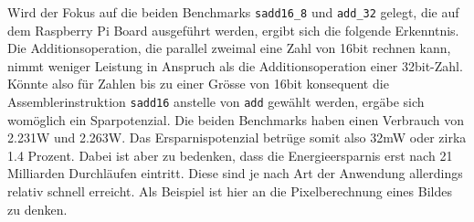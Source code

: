 Wird der Fokus auf die beiden Benchmarks \texttt{sadd16\_8} und \texttt{add\_32} gelegt, die auf dem Raspberry Pi Board ausgeführt werden, ergibt sich die folgende Erkenntnis. Die Additionsoperation, die parallel zweimal eine Zahl von 16bit rechnen kann, nimmt weniger Leistung in Anspruch als die Additionsoperation einer 32bit-Zahl. Könnte also für Zahlen bis zu einer Grösse von 16bit konsequent die Assemblerinstruktion \texttt{sadd16} anstelle von \texttt{add} gewählt werden, ergäbe sich womöglich ein Sparpotenzial. Die beiden Benchmarks haben einen Verbrauch von 2.231W und 2.263W. Das Ersparnispotenzial betrüge somit also 32mW oder zirka 1.4 Prozent. Dabei ist aber zu bedenken, dass die Energieersparnis erst nach 21 Milliarden Durchläufen eintritt. Diese sind je nach Art der Anwendung allerdings relativ schnell erreicht. Als Beispiel ist hier an die Pixelberechnung eines Bildes zu denken.















